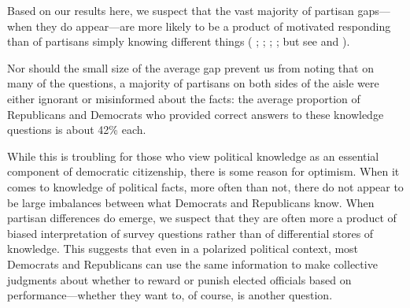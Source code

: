 \documentclass[12pt, letterpaper]{article}
\begin{document}
Based on our results here, we suspect that the vast majority of partisan gaps---when they do appear---are more likely to be a product of motivated responding than of partisans simply knowing different things (\citeauthor{bisgaard_slothuus_2018} \citeyear{bisgaard_slothuus_2018}; \citeauthor {bullocketal_2015} \citeyear{bullocketal_2015}; \citeauthor{prior2015you} \citeyear{prior2015you}; \citeauthor{schaffner_luks} \citeyear{schaffner_luks}; but see \citeauthor{berinsky_2017} \citeyear{berinsky_2017} and \citeauthor{peterson_iyengar_forth} \citeyear{peterson_iyengar_forth}). 

Nor should the small size of the average gap prevent us from noting that on many of the questions, a majority of partisans on both sides of the aisle were either ignorant or misinformed about the facts: the average proportion of Republicans and Democrats who provided correct answers to these knowledge questions is about 42\% each. 

While this is troubling for those who view political knowledge as an essential component of democratic citizenship, there is some reason for optimism. When it comes to knowledge of political facts, more often than not, there do not appear to be large imbalances between what Democrats and Republicans know. When partisan differences do emerge, we suspect that they are often more a product of biased interpretation of survey questions rather than of differential stores of knowledge. This suggests that even in a polarized political context, most Democrats and Republicans can use the same information to make collective judgments about whether to reward or punish elected officials based on performance---whether they want to, of course, is another question. 

\clearpage



\clearpage


\end{document}
